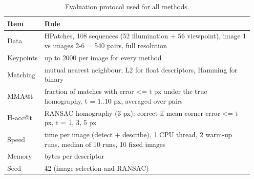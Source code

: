 \begin{table}
\caption{Evaluation protocol used for all methods.}
\label{tab:protocol}
\begin{tabular}{lp{11cm}}
\toprule
Item & Rule \\
\midrule
Data & HPatches, 108 sequences (52 illumination + 56 viewpoint), image 1 vs images 2-6 = 540 pairs, full resolution \\
Keypoints & up to 2000 per image for every method \\
Matching & mutual nearest neighbour; L2 for float descriptors, Hamming for binary \\
MMA@t & fraction of matches with error <= t px under the true homography, t = 1..10 px, averaged over pairs \\
H-acc@t & RANSAC homography (3 px); correct if mean corner error <= t px, t = 1, 3, 5 px \\
Speed & time per image (detect + describe), 1 CPU thread, 2 warm-up runs, median of 10 runs, 10 fixed images \\
Memory & bytes per descriptor \\
Seed & 42 (image selection and RANSAC) \\
\bottomrule
\end{tabular}
\end{table}
